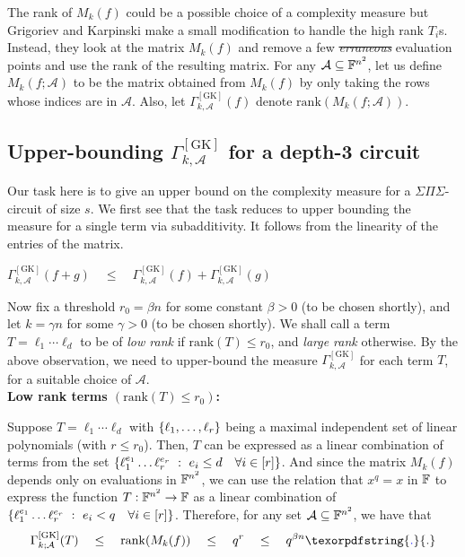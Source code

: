 \documentclass{birkjour}
\newcommand{\CM}[1]{\Gamma^{\mathrm{[#1]}}}
\newcommand{\SPS}{\Sigma\Pi\Sigma}
\providecommand{\DIFaddtex}[1]{{\protect\color{blue}\uwave{#1}}} %
\providecommand{\DIFdeltex}[1]{{\protect\color{red}\sout{#1}}}                      %
\providecommand{\DIFaddbegin}{} %
\providecommand{\DIFaddend}{} %
\providecommand{\DIFdelbegin}{} %
\providecommand{\DIFdelend}{} %
\providecommand{\DIFadd}[1]{\texorpdfstring{\DIFaddtex{#1}}{#1}} %
\providecommand{\DIFdel}[1]{\texorpdfstring{\DIFdeltex{#1}}{}} %
\begin{document}
The rank of $M_k(f)$ could be a possible choice of a complexity
measure but Grigoriev and Karpinski make a small
modification to handle the high rank $T_i$s. Instead, they look at the matrix $M_k(f)$ and remove a
few \emph{\DIFdelbegin \DIFdel{erraneous}\DIFdelend \DIFaddbegin \DIFadd{erroneous}\DIFaddend } evaluation points and use the rank of the
resulting matrix. For any $\mathcal{A}\subseteq \mathbb{F}^{n^2}$, let us
define $M_k(f;\mathcal{A})$ to be the matrix obtained from $M_k(f)$ by
only taking the rows whose indices are in
$\mathcal{A}$. Also, let $\CM{GK}_{k,\mathcal{A}}(f)$
denote $\mathrm{rank}(M_k(f;\mathcal{A}))$.



\subsection{Upper-bounding $\CM{GK}_{k,\mathcal{A}}$ for a depth-3 circuit}\label{sec:gk-upper-bound}

Our task here is to give an upper bound on the complexity measure for
	a $\SPS$-circuit of size $s$. We first see that the task reduces to 
	upper bounding the measure for a single term via subadditivity. It 
	follows from the linearity of the entries of the matrix. 

\begin{observation}\label{obs:GK-subadditivity}
  $\CM{GK}_{k,\mathcal{A}}(f + g) \quad\leq\quad
  \CM{GK}_{k,\mathcal{A}}(f) +
  \CM{GK}_{k,\mathcal{A}}(g)$\DIFaddbegin \DIFadd{.
}\DIFaddend \end{observation}

Now fix a threshold $r_0 = \beta n$ for some constant $\beta > 0$ (to be
chosen shortly), and let $k = \gamma n$ for some $\gamma>0$ (to be
chosen shortly). We shall call a term $T = \ell_1\cdots \ell_d$ to be
of \emph{low rank} if $\mathrm{rank}(T) \leq r_0$, and \emph{large rank}
otherwise. By the above observation, we need to upper-bound the measure $\CM{GK}_{k,\mathcal{A}}$ for each term $T$, for a
suitable choice of $\mathcal{A}$.\\

\noindent 
{\bf Low rank terms $(\mathrm{rank}(T) \leq r_0)$:}

Suppose $T = \ell_1 \cdots \ell_d$ with $\left\{\ell_1, \dots,
  \ell_r\right\}$ being a maximal independent set of linear polynomials (with
$r \leq r_0$). Then, $T$ can be expressed as a linear combination of
terms from the set $\left\{{\ell_1^{e_1}\dots \ell_r^{e_r}}\ : \ {e_i\leq d
  \quad \forall i\in [r]}\right\}$. And since the matrix $M_k(f)$ depends only
on evaluations in $\mathbb{F}^{n^2}$, we can use the relation that $x^q = x$
in $\mathbb{F}$ to express the function $T:\mathbb{F}^{n^2}\rightarrow \mathbb{F}$ as a linear
combination of $\left\{{\ell_1^{e_1}\dots \ell_r^{e_r}}\ : \ {e_i<q \quad
  \forall i\in [r]}\right\}$. Therefore, for any set $\mathcal{A}\subseteq
\mathbb{F}^{n^2}$, we have that
$$
\CM{GK}_{k;\mathcal{A}}(T) \quad \leq \quad
\mathrm{rank}(M_k(f)) \quad \leq \quad q^r \quad\leq \quad q^{\beta{n}}\DIFaddbegin \DIFadd{.
}\DIFaddend $$
\end{document}
